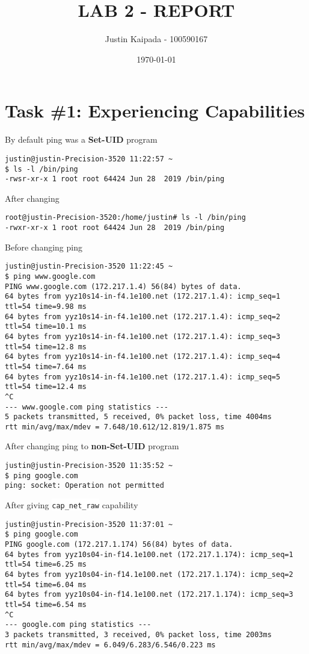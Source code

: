 \documentclass[11pt,letterpaper]{article}
\author{Justin Kaipada - 100590167}
\date{\today}
\title{LAB 2 - REPORT}
\let\OldTexttt\texttt
\renewcommand{\texttt}[1]{\OldTexttt{\footnotesize\colorbox{background}{\textcolor{foreground}{#1}}}}
\begin{document}
\maketitle
\newpage %

\section*{Task \#1: Experiencing Capabilities}
\label{sec:orga7c8b3f}

By default ping was a \textbf{Set-UID} program
\lstset{language=cpp,label= ,caption= ,captionpos=b,numbers=none}
\begin{lstlisting}
justin@justin-Precision-3520 11:22:57 ~ 
$ ls -l /bin/ping
-rwsr-xr-x 1 root root 64424 Jun 28  2019 /bin/ping
\end{lstlisting}

After changing
\lstset{language=cpp,label= ,caption= ,captionpos=b,numbers=none}
\begin{lstlisting}
root@justin-Precision-3520:/home/justin# ls -l /bin/ping
-rwxr-xr-x 1 root root 64424 Jun 28  2019 /bin/ping
\end{lstlisting}

Before changing ping
\lstset{language=cpp,label= ,caption= ,captionpos=b,numbers=none}
\begin{lstlisting}
justin@justin-Precision-3520 11:22:45 ~ 
$ ping www.google.com
PING www.google.com (172.217.1.4) 56(84) bytes of data.
64 bytes from yyz10s14-in-f4.1e100.net (172.217.1.4): icmp_seq=1 ttl=54 time=9.98 ms
64 bytes from yyz10s14-in-f4.1e100.net (172.217.1.4): icmp_seq=2 ttl=54 time=10.1 ms
64 bytes from yyz10s14-in-f4.1e100.net (172.217.1.4): icmp_seq=3 ttl=54 time=12.8 ms
64 bytes from yyz10s14-in-f4.1e100.net (172.217.1.4): icmp_seq=4 ttl=54 time=7.64 ms
64 bytes from yyz10s14-in-f4.1e100.net (172.217.1.4): icmp_seq=5 ttl=54 time=12.4 ms
^C
--- www.google.com ping statistics ---
5 packets transmitted, 5 received, 0% packet loss, time 4004ms
rtt min/avg/max/mdev = 7.648/10.612/12.819/1.875 ms
\end{lstlisting}

After changing ping to \textbf{non-Set-UID} program
\lstset{language=cpp,label= ,caption= ,captionpos=b,numbers=none}
\begin{lstlisting}
justin@justin-Precision-3520 11:35:52 ~ 
$ ping google.com
ping: socket: Operation not permitted
\end{lstlisting}

After giving \texttt{cap\_net\_raw} capability
\lstset{language=sh,label= ,caption= ,captionpos=b,numbers=none}
\begin{lstlisting}
justin@justin-Precision-3520 11:37:01 ~ 
$ ping google.com
PING google.com (172.217.1.174) 56(84) bytes of data.
64 bytes from yyz10s04-in-f14.1e100.net (172.217.1.174): icmp_seq=1 ttl=54 time=6.25 ms
64 bytes from yyz10s04-in-f14.1e100.net (172.217.1.174): icmp_seq=2 ttl=54 time=6.04 ms
64 bytes from yyz10s04-in-f14.1e100.net (172.217.1.174): icmp_seq=3 ttl=54 time=6.54 ms
^C
--- google.com ping statistics ---
3 packets transmitted, 3 received, 0% packet loss, time 2003ms
rtt min/avg/max/mdev = 6.049/6.283/6.546/0.223 ms
\end{lstlisting}
\end{document}
